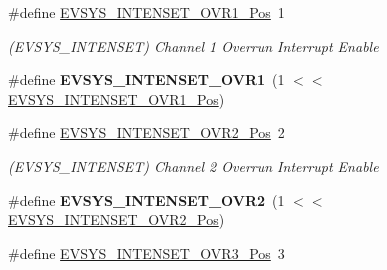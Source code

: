 \begin{DoxyCompactItemize}
\item 
\hypertarget{group___s_a_m_l21___e_v_s_y_s_ga42f1c86051bd4a74bdfc3e72c3e41ea8}{}\#define \hyperlink{group___s_a_m_l21___e_v_s_y_s_ga42f1c86051bd4a74bdfc3e72c3e41ea8}{E\+V\+S\+Y\+S\+\_\+\+I\+N\+T\+E\+N\+S\+E\+T\+\_\+\+O\+V\+R1\+\_\+\+Pos}~1\label{group___s_a_m_l21___e_v_s_y_s_ga42f1c86051bd4a74bdfc3e72c3e41ea8}

\begin{DoxyCompactList}\small\item\em (E\+V\+S\+Y\+S\+\_\+\+I\+N\+T\+E\+N\+S\+E\+T) Channel 1 Overrun Interrupt Enable \end{DoxyCompactList}\item 
\hypertarget{group___s_a_m_l21___e_v_s_y_s_ga962e676b307c2f3d448eb597e9449fe3}{}\#define {\bfseries E\+V\+S\+Y\+S\+\_\+\+I\+N\+T\+E\+N\+S\+E\+T\+\_\+\+O\+V\+R1}~(1 $<$$<$ \hyperlink{group___s_a_m_l21___e_v_s_y_s_ga42f1c86051bd4a74bdfc3e72c3e41ea8}{E\+V\+S\+Y\+S\+\_\+\+I\+N\+T\+E\+N\+S\+E\+T\+\_\+\+O\+V\+R1\+\_\+\+Pos})\label{group___s_a_m_l21___e_v_s_y_s_ga962e676b307c2f3d448eb597e9449fe3}

\item 
\hypertarget{group___s_a_m_l21___e_v_s_y_s_ga1c0eaf6dbfdeb7bc0f929d93425e5564}{}\#define \hyperlink{group___s_a_m_l21___e_v_s_y_s_ga1c0eaf6dbfdeb7bc0f929d93425e5564}{E\+V\+S\+Y\+S\+\_\+\+I\+N\+T\+E\+N\+S\+E\+T\+\_\+\+O\+V\+R2\+\_\+\+Pos}~2\label{group___s_a_m_l21___e_v_s_y_s_ga1c0eaf6dbfdeb7bc0f929d93425e5564}

\begin{DoxyCompactList}\small\item\em (E\+V\+S\+Y\+S\+\_\+\+I\+N\+T\+E\+N\+S\+E\+T) Channel 2 Overrun Interrupt Enable \end{DoxyCompactList}\item 
\hypertarget{group___s_a_m_l21___e_v_s_y_s_ga90de73ec250781f6cd4e2dffd618d15e}{}\#define {\bfseries E\+V\+S\+Y\+S\+\_\+\+I\+N\+T\+E\+N\+S\+E\+T\+\_\+\+O\+V\+R2}~(1 $<$$<$ \hyperlink{group___s_a_m_l21___e_v_s_y_s_ga1c0eaf6dbfdeb7bc0f929d93425e5564}{E\+V\+S\+Y\+S\+\_\+\+I\+N\+T\+E\+N\+S\+E\+T\+\_\+\+O\+V\+R2\+\_\+\+Pos})\label{group___s_a_m_l21___e_v_s_y_s_ga90de73ec250781f6cd4e2dffd618d15e}

\item 
\hypertarget{group___s_a_m_l21___e_v_s_y_s_ga476cf4fce873b97960504c8cdfa80ae6}{}\#define \hyperlink{group___s_a_m_l21___e_v_s_y_s_ga476cf4fce873b97960504c8cdfa80ae6}{E\+V\+S\+Y\+S\+\_\+\+I\+N\+T\+E\+N\+S\+E\+T\+\_\+\+O\+V\+R3\+\_\+\+Pos}~3\label{group___s_a_m_l21___e_v_s_y_s_ga476cf4fce873b97960504c8cdfa80ae6}


\end{DoxyCompactItemize}

